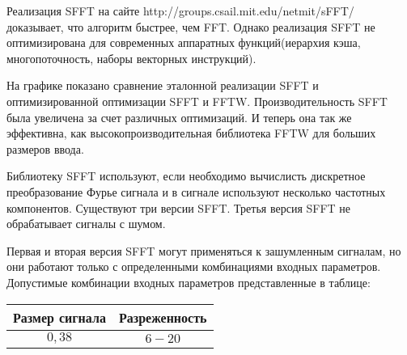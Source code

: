 Реализация SFFT на сайте http://groups.csail.mit.edu/netmit/sFFT/
доказывает, что алгоритм быстрее, чем FFT. Однако реализация SFFT не оптимизирована для современных аппаратных функций(иерархия кэша, многопоточность, наборы векторных инструкций).

На графике показано сравнение эталонной реализации SFFT и оптимизированной оптимизации SFFT и FFTW. Производительность SFFT была увеличена за счет различных оптимизаций. И теперь она так же эффективна, как высокопроизводительная библиотека FFTW для больших размеров ввода.

Библиотеку SFFT используют, если необходимо вычислисть дискретное преобразование Фурье сигнала и в сигнале используют несколько частотных компонентов. Существуют три версии SFFT. Третья версия SFFT не обрабатывает сигналы с шумом.

Первая и вторая версия SFFT могут применяться к зашумленным сигналам, но они работают только с определенными комбинациями входных параметров. Допустимые комбинации входных параметров представленные в таблице:

\begin{table}[ht]
	\caption{Допустимые комбинации входных параметров}%
	\label{tbl:test3_1}%
	\fontsize{14pt}{14pt}\selectfont
	\begin{longtable*}[c]{|c|c|} 
		\hline
		Размер сигнала & Разреженность \\
		\hline
		$0,38$ &
		$6-20$  \\
		\hline
	\end{longtable*}
\end{table}





